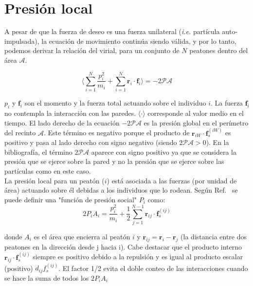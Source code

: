  
\section{Presión local}

A pesar de que la fuerza de deseo es una fuerza unilateral (\textit{i.e.} partícula auto-impulsada), la ecuación de movimiento continúa siendo válida, y por lo tanto, podemos derivar la relación del virial\cite{lion}, para un conjunto de $N$ peatones dentro del área $\mathcal{A}$.

\begin{equation}
 \bigg\langle\displaystyle\sum_{i=1}^N\displaystyle\frac{p_i^2}{m_i} + 
\displaystyle\sum_{i=1}^N 
\mathbf{r}_i\cdot\mathbf{f}_i\bigg\rangle=-2\mathcal{PA}\label{virial1}
\end{equation}


$p_i$  y $\mathbf{f}_i$ son el momento y la fuerza total actuando sobre el individuo $i$. La fuerza $\mathbf{f}_i$ no contempla la interacción con las paredes.  $\langle\cdot\rangle$ corresponde al valor medio en el tiempo. El lado derecho de la ecuación $-2\mathcal{PA}$ es la presión global en el perímetro del recinto $\mathcal{A}$. Este término es negativo porque el producto de $\mathbf{r}_{iW}\cdot\mathbf{f}_s^{(iW)}$ es positivo y pasa al lado derecho con signo negativo (siendo $2\mathcal{PA}>0$). En la bibliografía, el término $2\mathcal{PA}$ aparece con signo positivo ya que se considera la presión que se ejerce sobre la pared y no la presión que se ejerce sobre las partículas como en este caso.  \\
La presión local para un peatón ($i$) está asociada a las fuerzas (por unidad de área) actuando sobre él debidas a los individuos que lo rodean. Según Ref.~\cite{lion} se puede definir una "función de presión social" $P_i$ como:\\

\begin{equation}
2P_iA_i=\displaystyle\frac{p_i^2}{m_i} + \frac{1}{2}
\displaystyle\sum_{j=1}^{N-1}
\mathbf{r}_{ij}\cdot\mathbf{f}_s^{(ij)}\label{pa}
\end{equation}

\noindent donde $A_i$ es el área que encierra al peatón $i$ y 
$\mathbf{r}_{ij}=\mathbf{r}_{i}-\mathbf{r}_j$ (la distancia
entre dos peatones en la dirección desde j hacia i). Cabe destacar que el producto interno $\mathbf{r}_{ij}\cdot\mathbf{f}_s^{(ij)}$ siempre es positivo debido a la repulsión y es igual al producto escalar (positivo) $d_{ij}f_s^{(ij)}$. El factor 1/2 evita el doble conteo de las interacciones cuando se hace la suma de todos los $2P_iA_i$ \\ 

